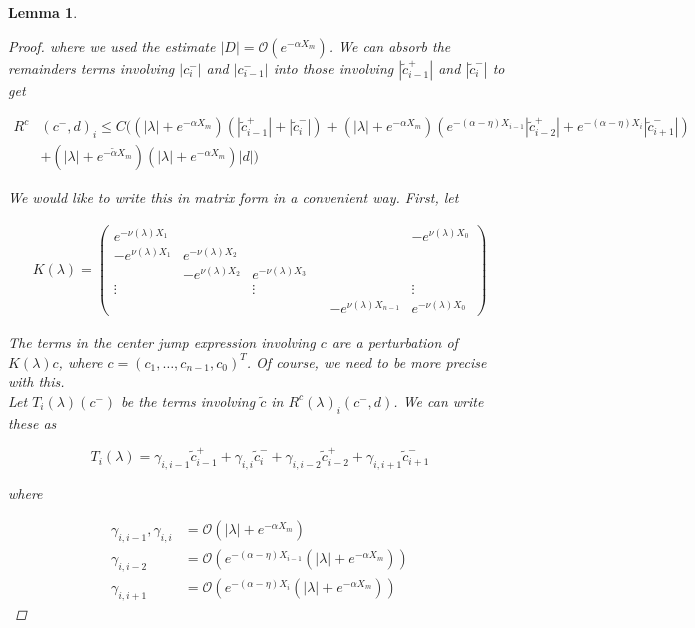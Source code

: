 \documentclass[12pt]{article}
\newtheorem{lemma}{Lemma}
\begin{document}
\begin{lemma}
\begin{proof}
where we used the estimate $|D| = \mathcal{O}(e^{-\alpha X_m})$. We can absorb the remainders terms involving $|c_i^-|$ and $|c_{i-1}^-|$ into those involving $|\tilde{c}_{i-1}^+|$ and $|\tilde{c}_{i}^-|$ to get

\begin{align*}
R^c&(c^-, d)_i \leq C \Big(
(|\lambda| + e^{-\alpha X_m})(|\tilde{c}_{i-1}^+| + |\tilde{c}_{i}^-|) + (|\lambda| + e^{-\alpha X_m})( e^{-(\alpha - \eta) X_{i-1}} |\tilde{c}_{i-2}^+| + e^{-(\alpha - \eta) X_i} |\tilde{c}_{i+1}^-|)  \\
&+ (|\lambda| + e^{-\tilde{\alpha} X_m})(|\lambda| + e^{-\alpha X_m})|d|
\Big)
\end{align*}

We would like to write this in matrix form in a convenient way. First, let

\begin{align*}
K(\lambda) =  
\begin{pmatrix}
e^{-\nu(\lambda)X_1} & & & & & -e^{\nu(\lambda)X_0} \\
-e^{\nu(\lambda)X_1} & e^{-\nu(\lambda)X_2} \\
& -e^{\nu(\lambda)X_2} & e^{-\nu(\lambda)X_3} \\
\vdots & & \vdots & &&  \vdots \\
& & & & -e^{\nu(\lambda)X_{n-1}} & e^{-\nu(\lambda)X_0} 
\end{pmatrix}
\end{align*}

The terms in the center jump expression involving $c$ are a perturbation of $K(\lambda)c$, where $c = (c_1, \dots, c_{n-1}, c_0)^T$. Of course, we need to be more precise with this.\\

Let $T_i(\lambda)(c^-)$ be the terms involving $\tilde{c}$ in $R^c(\lambda)_i(c^-, d)$. We can write these as

\[
T_i(\lambda) = \gamma_{i,i-1} \tilde{c}_{i-1}^+ + \gamma_{i,i} \tilde{c}_{i}^- + \gamma_{i,i-2} \tilde{c}_{i-2}^+ + \gamma_{i,i+1} \tilde{c}_{i+1}^-
\] 

where

\begin{align*}
\gamma_{i,i-1}, \gamma_{i,i} &= \mathcal{O}(|\lambda| + e^{-\alpha X_m}) \\
\gamma_{i,i-2} &= \mathcal{O}(e^{-(\alpha - \eta) X_{i-1}}(|\lambda| + e^{-\alpha X_m})) \\
\gamma_{i,i+1} &= \mathcal{O}(e^{-(\alpha - \eta) X_i}(|\lambda| + e^{-\alpha X_m}))
\end{align*}


\end{proof}
\end{lemma}
\end{document}

